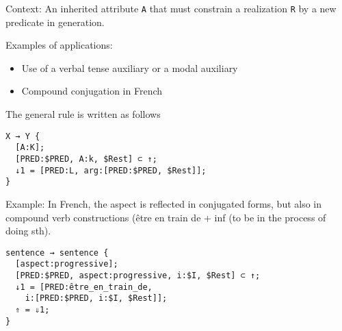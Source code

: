 \documentclass[11pt]{article}
\begin{document}
Context:
An inherited attribute \texttt{A} that must constrain a realization
\texttt{R} by a new predicate in generation.

Examples of applications:
\begin{itemize}
\item Use of a verbal tense auxiliary or a modal auxiliary
\item Compound conjugation in French
\end{itemize}

The general rule is written as follows

\begin{lstlisting}
X → Y {
  [A:K];
  [PRED:$PRED, A:k, $Rest] ⊂ ↑;
  ↓1 = [PRED:L, arg:[PRED:$PRED, $Rest]];
}

\end{lstlisting}

Example:
In French, the aspect is reflected in conjugated forms, but also in
compound verb constructions (\og être en train de + inf\fg{} (to be in the
process of doing sth). 

\begin{lstlisting}
sentence → sentence {
  [aspect:progressive];
  [PRED:$PRED, aspect:progressive, i:$I, $Rest] ⊂ ↑;
  ↓1 = [PRED:être_en_train_de, 
	i:[PRED:$PRED, i:$I, $Rest]];
  ⇑ = ⇓1;
}
\end{lstlisting}
\end{document}
